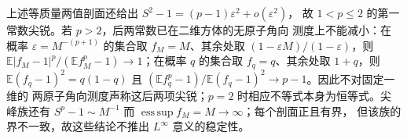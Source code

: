 \begin{remark}[常数的尖锐性范围]\label{rem:angular-stability-sharp}
上述等质量两值剖面还给出 $S^2-1=(p-1)\varepsilon^2+o(\varepsilon^2)$，
故 $1<p\le2$ 的第一常数尖锐。若 $p>2$，后两常数已在二维方体的无原子角向
测度上不能减小：在概率
\(\varepsilon=M^{-(p+1)}\) 的集合取 $f_M=M$、其余处取
\((1-\varepsilon M)/(1-\varepsilon)\)，则
\(\mathbb E|f_M-1|^p/(\mathbb Ef_M^p-1)\to1\)；在概率 $q$ 的集合取
$f_q=q$、其余处取 $1+q$，则
\(\mathbb E(f_q-1)^2=q(1-q)\) 且
\((\mathbb Ef_q^p-1)/\mathbb E(f_q-1)^2\to p-1\)。因此不对固定一维的
两原子角向测度声称这后两项尖锐；$p=2$ 时相应不等式本身为恒等式。尖峰族还有
$S^p-1\sim M^{-1}$ 而 $\operatorname*{ess\,sup}f_M=M\to\infty$；每个剖面正且有界，
但该族的界不一致，故这些结论不推出 $L^\infty$ 意义的稳定性。
\end{remark}
